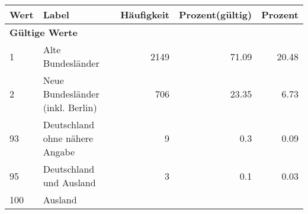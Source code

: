      \begin{longtable}{lXrrr}
     \toprule
     \textbf{Wert} & \textbf{Label} & \textbf{Häufigkeit} & \textbf{Prozent(gültig)} & \textbf{Prozent} \\
     \endhead
     \midrule
     \multicolumn{5}{l}{\textbf{Gültige Werte}}\\

     1 &
     \multicolumn{1}{X}{ Alte Bundesländer   } &


       \num{2149} &
       \num[round-mode=places,round-precision=2]{71.09} &
         \num[round-mode=places,round-precision=2]{20.48} \\

     2 &
     \multicolumn{1}{X}{ Neue Bundesländer (inkl. Berlin)   } &


       \num{706} &
       \num[round-mode=places,round-precision=2]{23.35} &
         \num[round-mode=places,round-precision=2]{6.73} \\

     93 &
     \multicolumn{1}{X}{ Deutschland ohne nähere Angabe   } &


       \num{9} &
       \num[round-mode=places,round-precision=2]{0.3} &
         \num[round-mode=places,round-precision=2]{0.09} \\

     95 &
     \multicolumn{1}{X}{ Deutschland und Ausland   } &


       \num{3} &
       \num[round-mode=places,round-precision=2]{0.1} &
         \num[round-mode=places,round-precision=2]{0.03} \\

     100 &
     \multicolumn{1}{X}{ Ausland   } &



\end{longtable}
